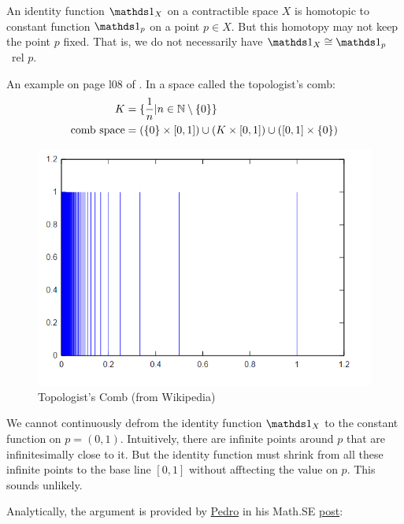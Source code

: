 \begin{remark}
    An identity function $\id_X$ on a contractible space $X$
    is homotopic to constant function $\id_p$ on a point $p\in X$. But
    this homotopy may not keep the point $p$ fixed. That is, we do not
    necessarily have $\id_X\cong\id_p$~rel $p$.

    An example on page l08 of \cite{book}. In a space called
    the topologist's comb:
    \begin{align*}
        K &= \{\frac{1}{n}|n\in\mathbb{N}\setminus\{0\}\} \\
        \text{comb space}&=(\{0\} \times [0,1] ) \cup (K \times [0,1]) \cup ([0,1] \times \{0\})
    \end{align*}
    \begin{figure}[H]
        \centering
        \includegraphics[width=0.6\linewidth]{pics/comb-space.PNG}
        \caption{Topologist's Comb (from Wikipedia)}
    \end{figure}
    We cannot continuously defrom the identity function $\id_X$ to the
    constant function on $p=(0,1)$. Intuitively, there are infinite
    points around $p$ that are infinitesimally close to it. But the
    identity function must shrink from all these infinite points to
    the base line $[0,1]$ without afftecting the value on $p$. This
    sounds unlikely.

    Analytically, the argument is provided by
    \href{http://math.stackexchange.com/users/172604/pedro}{Pedro} in
    his Math.SE
    \href{http://math.stackexchange.com/a/952989/184811}{post}:

\end{remark}
